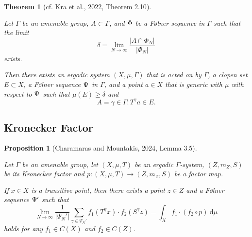 \documentclass[
  british,
]{article}
\theoremstyle{definition}
\theoremstyle{plain}
\theoremstyle{plain}
\newtheorem{theorem}{Theorem}[section]
\theoremstyle{plain}
\newtheorem{proposition}{Proposition}[section]
\theoremstyle{remark}
\newcommand{\AmenableGroup}{{\Gamma}}
\newcommand{\AmenableGroupElement}{{\gamma}}
\newcommand{\CountingMeasure}[1]{{\left|#1\right|}}
\newcommand{\Folner}[1][\vphantom{}]{{\Phi}_{#1}}
\newcommand{\FurstenbergFolner}[1][{\vphantom{}}]{{\Psi}_{#1}}
\newcommand{\GroupAction}[2]{T^{#1}{#2}}
\newcommand{\KroneckerAction}[2]{S^{#1}{#2}}
\newcommand{\KroneckerFactorMap}{p}
\newcommand{\KroneckerMeasure}{{m_Z}}
\newcommand{\KroneckerSpace}{{Z}}
\newcommand{\KroneckerSpaceElement}{{z}}
\newcommand{\Measure}{{\mu}}
\newcommand{\ShiftSpace}{{X}}
\newcommand{\ShiftSpaceElement}{{x}}
\newcommand{\FurstenbergSystem}{(\ShiftSpace,\Measure,T)}
\newcommand{\KroneckerFactor}{{(\KroneckerSpace,\KroneckerMeasure,S)}}
\begin{document}
\begin{theorem}[{cf. Kra et al., 2022, Theorem
2.10}]\protect\hypertarget{thm-Furstenberg}{}\label{thm-Furstenberg}

Let \(\AmenableGroup\) be an amenable group,
\(A\subset \AmenableGroup\), and \(\Folner\) be a Følner sequence in
\(\AmenableGroup\) such that the limit
\[\delta=\lim_{N\rightarrow\infty}\frac{\CountingMeasure{A\cap\Folner[N]}}{\CountingMeasure{\Folner[N]}}\]
exists.

Then there exists an ergodic system
\((\ShiftSpace,\Measure,\AmenableGroup)\) that is acted on by
\(\AmenableGroup\), a clopen set \(E\subset\ShiftSpace\), a Følner
sequence \(\FurstenbergFolner\) in \(\AmenableGroup\), and a point
\(a\in\ShiftSpace\) that is generic with \(\Measure\) with respect to
\(\FurstenbergFolner\) such that \(\Measure(E)\geq\delta\) and
\[A={\AmenableGroupElement\in \AmenableGroup:\GroupAction{\AmenableGroupElement}{a}\in E}. \]

\end{theorem}

\subsection{Kronecker Factor}\label{kronecker-factor}

\begin{proposition}[{Charamaras and Mountakis, 2024, Lemma
3.5}]\protect\hypertarget{prp-KroneckerGeneric}{}\label{prp-KroneckerGeneric}

Let \(\AmenableGroup\) be an amenable group, let \(\FurstenbergSystem\)
be an ergodic \(\AmenableGroup\)-system, \(\KroneckerFactor\) be its
Kronecker factor and
\(\KroneckerFactorMap: \FurstenbergSystem\rightarrow\KroneckerFactor\)
be a factor map.

If \(\ShiftSpaceElement\in\ShiftSpace\) is a transitive point, then
there exists a point \(\KroneckerSpaceElement\in\KroneckerSpace\) and a
Følner sequence \(\FurstenbergFolner'\) such that
\[\lim_{N\rightarrow\infty}\frac{1}{\CountingMeasure{\FurstenbergFolner[N]'}}\sum_{\AmenableGroupElement\in\FurstenbergFolner[N]'}f_1(\GroupAction{\AmenableGroupElement}{\ShiftSpaceElement})\cdot f_2(\KroneckerAction{\AmenableGroupElement}{\KroneckerSpaceElement})=\int_\ShiftSpace f_1\cdot(f_2\circ\KroneckerFactorMap)\ \mathrm{d}\mu \]
holds for any \(f_1\in C(\ShiftSpace)\) and
\(f_2\in C(\KroneckerSpace)\).

\end{proposition}
\end{document}
